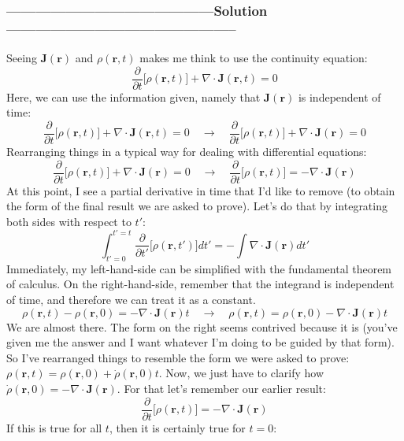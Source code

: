 \documentclass[a4paper,12pt]{article} %
\begin{document}
\subsubsection*{------------------------------------------Solution-----------------------------------------------}
Seeing $\mathbf{J}(\mathbf{r})$ and $\rho(\mathbf{r}, t)$ makes me think to use the continuity equation:
\begin{equation}
\frac{\partial}{\partial t}\Big[\rho(\mathbf{r}, t)\Big]+\nabla \cdot \mathbf{J}(\mathbf{r}, t)=0
	\label{eq:cont-eq}
\end{equation}
Here, we can use the information given, namely that $\mathbf{J}(\mathbf{r})$ is independent of time:
$$ \frac{\partial}{\partial t}\Big[\rho(\mathbf{r}, t)\Big]+\nabla \cdot \mathbf{J}(\mathbf{r}, t)=0 \quad\rightarrow\quad \frac{\partial}{\partial t}\Big[\rho(\mathbf{r}, t)\Big]+\nabla \cdot \mathbf{J}(\mathbf{r})=0 $$
Rearranging things in a typical way for dealing with differential equations:
$$ \frac{\partial}{\partial t}\Big[\rho(\mathbf{r}, t)\Big]+\nabla \cdot \mathbf{J}(\mathbf{r})=0 \quad\rightarrow\quad \frac{\partial}{\partial t}\Big[\rho(\mathbf{r}, t)\Big]=- \nabla \cdot \mathbf{J}(\mathbf{r})$$
At this point, I see a partial derivative in time that I'd like to remove (to obtain the form of the final result we are asked to prove). Let's do that by integrating both sides with respect to $t'$:
$$ \int_{t'=0}^{t'=t} \frac{\partial}{\partial t'}\Big[\rho(\mathbf{r}, t')\Big] dt' = -\int \nabla \cdot \mathbf{J}(\mathbf{r}) dt' $$
Immediately, my left-hand-side can be simplified with the fundamental theorem of calculus. On the right-hand-side, remember that the integrand is independent of time, and therefore we can treat it as a constant.
$$ \rho(\mathbf{r}, t) - \rho(\mathbf{r}, 0) = -\nabla\cdot\mathbf{J}(\mathbf{r})t \quad\rightarrow\quad \rho(\mathbf{r}, t) = \rho(\mathbf{r}, 0) -\nabla\cdot\mathbf{J}(\mathbf{r})t  $$
We are almost there. The form on the right seems contrived because it is (you've given me the answer and I want whatever I'm doing to be guided by that form). So I've rearranged things to resemble the form we were asked to prove: $\rho(\mathbf{r}, t)=\rho(\mathbf{r}, 0)+\dot{\rho}(\mathbf{r}, 0) t$. Now, we just have to clarify how $\dot{\rho}(\mathbf{r}, 0) = -\nabla\cdot\mathbf{J}(\mathbf{r})$. For that let's remember our earlier result:
$$ \frac{\partial}{\partial t}\Big[\rho(\mathbf{r}, t)\Big]=-\nabla \cdot \mathbf{J}(\mathbf{r}) $$
If this is true for all $t$, then it is certainly true for $t=0$:
\end{document}

